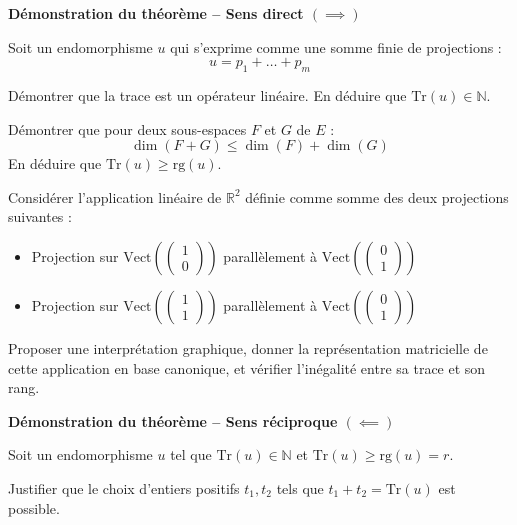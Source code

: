 \documentclass[10pt,a4paper]{article}
\begin{document}
\bigskip
\textbf{Démonstration du théorème -- Sens direct $(\implies)$}

Soit un endomorphisme $u$ qui s'exprime comme une somme finie de projections :
\[
u = p_1 + \dots + p_m
\]

\q Démontrer que la trace est un opérateur linéaire. En déduire que $\mathrm{Tr}(u) \in \mathbb{N}$.

\q Démontrer que pour deux sous-espaces $F$ et $G$ de $E$ :
\[
\dim(F + G) \leq \dim(F) + \dim(G)
\]
En déduire que $\mathrm{Tr}(u) \geq \mathrm{rg}(u)$.

\q Considérer l'application linéaire de $\mathbb{R}^2$ définie comme somme des deux projections
suivantes :
\begin{itemize}
\item Projection sur $\mathrm{Vect}\left(\begin{pmatrix} 1\\0 \end{pmatrix}\right)$ parallèlement à
$\mathrm{Vect}\left(\begin{pmatrix} 0\\1 \end{pmatrix}\right)$
\item Projection sur $\mathrm{Vect}\left(\begin{pmatrix} 1\\1 \end{pmatrix}\right)$ parallèlement à
$\mathrm{Vect}\left(\begin{pmatrix} 0\\1 \end{pmatrix}\right)$
\end{itemize}
Proposer une interprétation graphique, donner la représentation matricielle de cette application en
base canonique, et vérifier l'inégalité entre sa trace et son rang.

\bigskip
\textbf{Démonstration du théorème -- Sens réciproque $(\impliedby)$}

Soit un endomorphisme $u$ tel que $\mathrm{Tr}(u) \in \mathbb{N}$ et $\mathrm{Tr}(u) \geq
\mathrm{rg}(u) = r$.

\q Justifier que le choix d'entiers positifs $t_1, t_2$ tels que $t_1 + t_2 = \mathrm{Tr}(u)$ est
possible.
\end{document}
